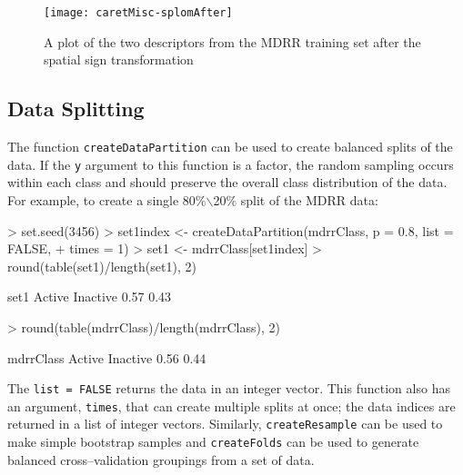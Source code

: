 \documentclass[12pt]{article}
\begin{document}
\begin{figure}[p]
   \begin{center}		
\texttt{[image: caretMisc-splomAfter]}
      \caption{A plot of the two descriptors from the MDRR training set after the spatial sign transformation}
      \label{f:descSplomTrans}         
   \end{center}
\end{figure}


\subsection{Data Splitting}

The function \texttt{createDataPartition} can be used to create balanced splits of the data. If the \texttt{y} argument to this function is a factor, the random sampling occurs within each class and should preserve the overall class distribution of the data. For example, to create a single 80$\%$$\backslash$20$\%$ split of the MDRR data:
\begin{small}
\begin{Schunk}
\begin{Sinput}
> set.seed(3456)
> set1index <- createDataPartition(mdrrClass, p = 0.8, list = FALSE, 
+     times = 1)
> set1 <- mdrrClass[set1index]
> round(table(set1)/length(set1), 2)
\end{Sinput}
\begin{Soutput}
set1
  Active Inactive 
    0.57     0.43 
\end{Soutput}
\begin{Sinput}
> round(table(mdrrClass)/length(mdrrClass), 2)
\end{Sinput}
\begin{Soutput}
mdrrClass
  Active Inactive 
    0.56     0.44 
\end{Soutput}
\end{Schunk}
The \texttt{list = FALSE} returns the data in an integer vector. This function also has an argument, \texttt{times}, that can create multiple splits at once; the data indices are returned in a list of integer vectors. Similarly, \texttt{createResample} can be used to make simple bootstrap samples and \texttt{createFolds} can be used to generate balanced cross--validation groupings from a set of data.
\end{small}
\end{document}
